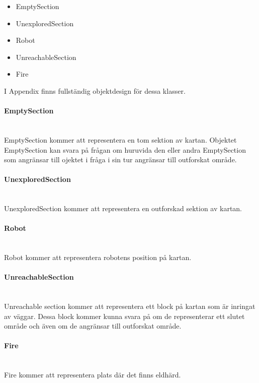 \documentclass[a4paper,12pt,fleqn]{article}
\begin{document}
\begin{itemize}
\item{EmptySection}
\item{UnexploredSection}
\item{Robot}
\item{UnreachableSection}
\item{Fire}
\end{itemize}

I Appendix finns fullständig objektdesign för dessa klasser. 

\paragraph{EmptySection} 
~\\
EmptySection kommer att representera en tom sektion av kartan. Objektet EmptySection kan svara på frågan om huruvida den eller andra EmptySection som angränsar till ojektet i fråga i sin tur angränsar till outforskat område. 

\paragraph{UnexploredSection} 
~\\
UnexploredSection kommer att representera en outforskad sektion av kartan. 

\paragraph{Robot} 
~\\
Robot kommer att representera robotens position på kartan. 

\paragraph{UnreachableSection} 
~\\
Unreachable section kommer att representera ett block på kartan som är inringat av väggar. Dessa block kommer kunna svara på om de representerar ett slutet område och även om de angränsar till outforskat område. 

\paragraph{Fire} 
~\\
Fire kommer att representera plats där det finns eldhärd. 

\newpage
\end{document}
